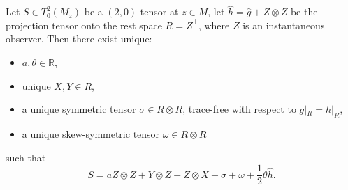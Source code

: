 Let $S \in T_0^2(M_z)$ be a $(2,0)$ tensor at $z \in M$, let $\hat{h} = \hat{g} + Z \otimes Z$ be the projection tensor onto the rest space $R = Z^\perp$, where $Z$ is an instantaneous observer. Then there exist unique:
\begin{itemize}
    \item $a, \theta \in \mathbb{R}$,
    \item unique $X, Y \in R$,
    \item a unique symmetric tensor $\sigma \in R \otimes R$, trace-free with respect to $g|_R = h|_R$,
    \item a unique skew-symmetric tensor $\omega \in R \otimes R$
\end{itemize}
such that
$$S = aZ \otimes Z + Y \otimes Z + Z \otimes X + \sigma + \omega + \frac{1}{2}\theta \hat{h}.$$
